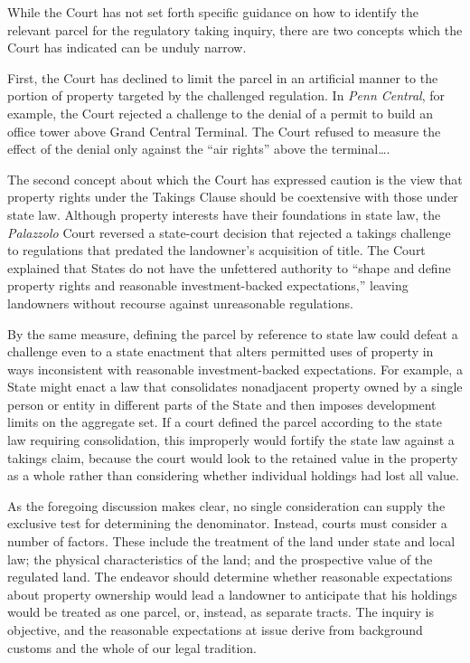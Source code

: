 While the Court has not set forth specific guidance on how to identify the
relevant parcel for the regulatory taking inquiry, there are two concepts which
the Court has indicated can be unduly narrow.

First, the Court has declined to limit the parcel in an artificial manner to the
portion of property targeted by the challenged regulation. In \textit{Penn
Central}, for example, the Court rejected a challenge to the denial of a permit
to build an office tower above Grand Central Terminal. The Court refused to
measure the effect of the denial only against the ``air rights'' above the
terminal\ldots.

The second concept about which the Court has expressed caution is the view that
property rights under the Takings Clause should be coextensive with those under
state law. Although property interests have their foundations in state law, the
\textit{Palazzolo} Court reversed a state-court decision that rejected a takings
challenge to regulations that predated the landowner's acquisition of title. The
Court explained that States do not have the unfettered authority to ``shape and
define property rights and reasonable investment-backed expectations,'' leaving
landowners without recourse against unreasonable regulations.

By the same measure, defining the parcel by reference to state law could defeat
a challenge even to a state enactment that alters permitted uses of property in
ways inconsistent with reasonable investment-backed expectations. For example, a
State might enact a law that consolidates nonadjacent property owned by a single
person or entity in different parts of the State and then imposes development
limits on the aggregate set. If a court defined the parcel according to the
state law requiring consolidation, this improperly would fortify the state law
against a takings claim, because the court would look to the retained value in
the property as a whole rather than considering whether individual holdings had
lost all value.





As the foregoing discussion makes clear, no single consideration can supply the
exclusive test for determining the denominator. Instead, courts must consider a
number of factors. These include the treatment of the land under state and local
law; the physical characteristics of the land; and the prospective value of the
regulated land. The endeavor should determine whether reasonable expectations
about property ownership would lead a landowner to anticipate that his holdings
would be treated as one parcel, or, instead, as separate tracts. The inquiry is
objective, and the reasonable expectations at issue derive from background
customs and the whole of our legal tradition. 


